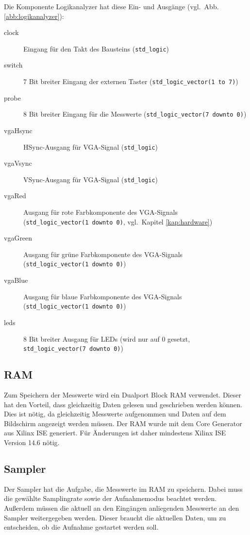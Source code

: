 \documentclass[IN,ngerman,utf8,12pt]{tumbook}
\newcommand{\vgl}{vgl.\ }
\begin{document}
Die Komponente Logikanalyzer hat diese Ein- und Ausgänge (\vgl Abb. \ref{abb:logikanalyzer}):
\begin{description}
    \item[clock] Eingang für den Takt des Bausteins (\texttt{std\_logic})
    \item[switch] 7 Bit breiter Eingang der externen Taster (\texttt{std\_logic\_vector(1 to 7)})
    \item[probe] 8 Bit breiter Eingang für die Messwerte (\texttt{std\_logic\_vector(7 downto 0)})
    \item[vgaHsync] HSync-Ausgang für VGA-Signal (\texttt{std\_logic})
    \item[vgaVsync] VSync-Ausgang für VGA-Signal (\texttt{std\_logic})
    \item[vgaRed] Ausgang für rote Farbkomponente des VGA-Signals \\
        (\texttt{std\_logic\_vector(1 downto 0)}, \vgl Kapitel \ref{kap:hardware})
    \item[vgaGreen] Ausgang für grüne Farbkomponente des VGA-Signals \\
        (\texttt{std\_logic\_vector(1 downto 0)})
    \item[vgaBlue] Ausgang für blaue Farbkomponente des VGA-Signals \\
        (\texttt{std\_logic\_vector(1 downto 0)})
    \item[leds] 8 Bit breiter Ausgang für LEDs (wird nur auf 0 gesetzt, \\
        \texttt{std\_logic\_vector(7 downto 0)})
\end{description}

\subsection{RAM}

Zum Speichern der Messwerte wird ein Dualport Block RAM verwendet.
Dieser hat den Vorteil, dass gleichzeitig Daten gelesen und geschrieben werden können.
Dies ist nötig, da gleichzeitig Messwerte aufgenommen und Daten auf dem Bildschirm angezeigt werden müssen.
Der RAM wurde mit dem Core Generator aus Xilinx ISE generiert.
Für Änderungen ist daher mindestens Xilinx ISE Version 14.6 nötig.

\subsection{Sampler}
\label{kap:sampler}

Der Sampler hat die Aufgabe, die Messwerte im RAM zu speichern.
Dabei muss die gewählte Samplingrate sowie der Aufnahmemodus beachtet werden.
Außerdem müssen die aktuell an den Eingängen anliegenden Messwerte an den Sampler weitergegeben werden.
Dieser braucht die aktuellen Daten, um zu entscheiden, ob die Aufnahme gestartet werden soll.
\end{document}
